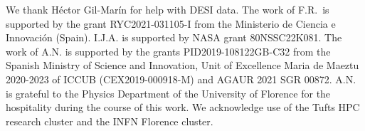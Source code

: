 \documentclass[aps,prd,twocolumn,notitlepage,
superscriptaddress,
nofootinbib,floatfix]{revtex4-2}
\begin{document}
\begin{acknowledgments}
We thank H\'ector Gil-Mar\'in  for help with DESI data. The work of F.R.~is supported by the grant RYC2021-031105-I from the Ministerio de Ciencia e Innovación (Spain). I.J.A. is supported by NASA grant 80NSSC22K081. The work of A.N. is supported by the grants PID2019-108122GB-C32 from the Spanish Ministry of Science and Innovation, Unit of Excellence Maria de Maeztu 2020-2023 of ICCUB (CEX2019-000918-M) and AGAUR 2021 SGR 00872. A.N. is grateful to the Physics Department of the University of Florence for the hospitality during the course of this work.
We acknowledge use of the Tufts HPC research cluster and the INFN Florence cluster.
\end{acknowledgments}


%

\end{document}
